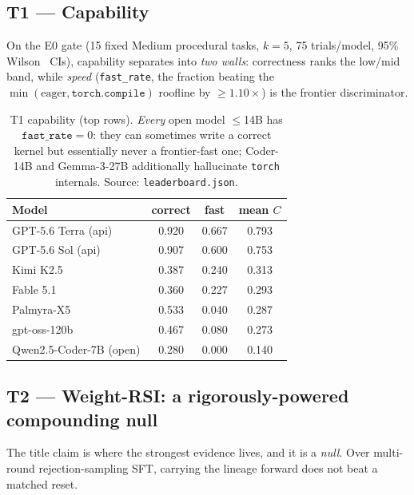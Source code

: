 \subsection{T1 --- Capability}
On the E0 gate (15 fixed Medium procedural tasks, $k{=}5$, 75 trials/model, 95\% Wilson~\cite{wilson1927interval} CIs), capability
separates into \emph{two walls}: correctness ranks the low/mid band, while \emph{speed}
(\texttt{fast\_rate}, the fraction beating the $\min(\text{eager},\texttt{torch.compile})$ roofline by
$\ge1.10\times$) is the frontier discriminator.

\begin{table}[H]\centering\small
\begin{tabular}{lccc}
\toprule
Model & correct & fast & mean $C$ \\
\midrule
GPT-5.6 Terra (api) & 0.920 & 0.667 & 0.793 \\
GPT-5.6 Sol (api)   & 0.907 & 0.600 & 0.753 \\
Kimi K2.5           & 0.387 & 0.240 & 0.313 \\
Fable 5.1           & 0.360 & 0.227 & 0.293 \\
Palmyra-X5          & 0.533 & 0.040 & 0.287 \\
gpt-oss-120b        & 0.467 & 0.080 & 0.273 \\
Qwen2.5-Coder-7B (open) & 0.280 & 0.000 & 0.140 \\
\bottomrule
\end{tabular}
\caption{T1 capability (top rows). \emph{Every} open model $\le$14B has $\texttt{fast\_rate}=0$: they can
sometimes write a correct kernel but essentially never a frontier-fast one; Coder-14B and Gemma-3-27B
additionally hallucinate \texttt{torch} internals. Source: \texttt{leaderboard.json}.}
\end{table}


\subsection{T2 --- Weight-RSI: a rigorously-powered compounding null}
The title claim is where the strongest evidence lives, and it is a \emph{null}. Over multi-round rejection-sampling
SFT, carrying the lineage forward does not beat a matched reset.

